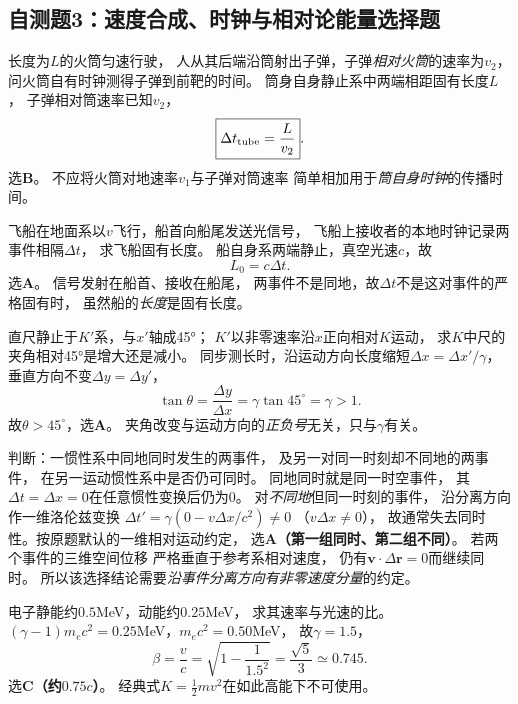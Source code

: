 \subsection{自测题3：速度合成、时钟与相对论能量选择题}

\problemtext 长度为$L$的火筒匀速行驶，
人从其后端沿筒射出子弹，子弹\emph{相对火筒}的速率为$v_2$，
问火筒自有时钟测得子弹到前靶的时间。
\workings
筒身自身静止系中两端相距固有长度$L$，
子弹相对筒速率已知$v_2$，
\[
\boxed{\Delta t_{\rm tube}=\frac L{v_2}}.
\]
选\textbf{B}。
\crosscheck 不应将火筒对地速率$v_1$与子弹对筒速率
简单相加用于\emph{筒自身时钟}的传播时间。

\problemtext 飞船在地面系以$v$飞行，船首向船尾发送光信号，
飞船上接收者的本地时钟记录两事件相隔$\Delta t$，
求飞船固有长度。
\workings
船自身系两端静止，真空光速$c$，故
\[
\boxed{L_0=c\Delta t}.
\]
选\textbf{A}。
\crosscheck 信号发射在船首、接收在船尾，
两事件不是同地，故$\Delta t$不是这对事件的严格固有时，
虽然船的\emph{长度}是固有长度。

\problemtext 直尺静止于$K'$系，与$x'$轴成45°；
$K'$以非零速率沿$x$正向相对$K$运动，
求$K$中尺的夹角相对45°是增大还是减小。
\workings
同步测长时，沿运动方向长度缩短$\Delta x=\Delta x'/\gamma$，
垂直方向不变$\Delta y=\Delta y'$，
\[
\tan\theta=\frac{\Delta y}{\Delta x}
=\gamma\tan45^\circ=\gamma>1.
\]
故$\boxed{\theta>45^\circ}$，选\textbf{A}。
\crosscheck 夹角改变与运动方向的\emph{正负号}无关，只与$\gamma$有关。

\problemtext 判断：一惯性系中同地同时发生的两事件，
及另一对同一时刻却不同地的两事件，
在另一运动惯性系中是否仍可同时。
\workings
同地同时就是同一时空事件，
其$\Delta t=\Delta x=0$在任意惯性变换后仍为0。
对\emph{不同地}但同一时刻的事件，
沿分离方向作一维洛伦兹变换
$\Delta t'=\gamma(0-v\Delta x/c^2)\ne0$
（$v\Delta x\ne0$），
故通常失去同时性。按原题默认的一维相对运动约定，
选\textbf{A（第一组同时、第二组不同）}。
\crosscheck 若两个事件的三维空间位移
严格垂直于参考系相对速度，
仍有$\bm v\cdot\Delta\bm r=0$而继续同时。
所以该选择结论需要\emph{沿事件分离方向有非零速度分量}的约定。

\problemtext 电子静能约$0.5$MeV，动能约$0.25$MeV，
求其速率与光速的比。
\workings
$(\gamma-1)m_ec^2=0.25$MeV，$m_ec^2=0.50$MeV，
故$\gamma=1.5$，
\[
\boxed{\beta=\frac vc=\sqrt{1-\frac1{1.5^2}}
=\frac{\sqrt5}{3}\simeq0.745}.
\]
选\textbf{C（约$0.75c$）}。
\crosscheck 经典式$K=\tfrac12mv^2$在如此高能下不可使用。

